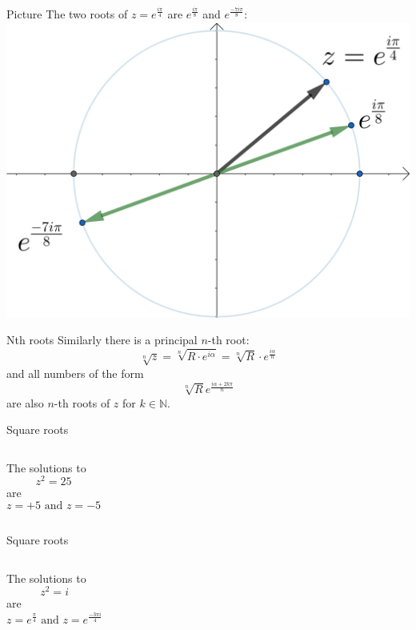 \documentclass{beamer}
\begin{document}
\begin{frame}{Picture}
  	The two roots of $z = e^{\frac{i\pi}{4}}$ are $e^{\frac{i\pi}{8}}$ and $e^{\frac{-7i\pi}{8}}$:\vfill
	\includegraphics[scale=3]{roots-pi-4.png}
\end{frame}

\begin{frame}{Nth roots}
Similarly there is a principal $n$-th root:\vfill
\begin{equation*}
\sqrt[n]{z} = \sqrt[n]{R\cdot e^{i\alpha}} = \sqrt[n]{R}\cdot e^{\frac{i\alpha}{n}}
\end{equation*}\vfill
and all numbers of the form\vfill
\begin{equation*}
	\sqrt[n]{R}e^{\frac{i\alpha+2k\pi}{n}}
\end{equation*}\vfill
are also $n$-th roots of $z$ for $k\in \mathbb{N}$.
\end{frame}

\begin{frame}{Square roots}
\begin{columns}
The solutions to
\begin{equation*}
	z^2 = 25
\end{equation*}
are
\begin{equation*}
z=+5\text{ and } z=-5
\end{equation*}
\end{columns}
\end{frame}

\begin{frame}{Square roots}
\begin{columns}
The solutions to
\begin{equation*}
	z^2 = i
\end{equation*}
are
\begin{equation*}
z=e^{\frac{\pi}{4}}\text{ and } z=e^{\frac{-3\pi i}{4}}
\end{equation*}
\end{columns}
\end{frame}
\end{document}
